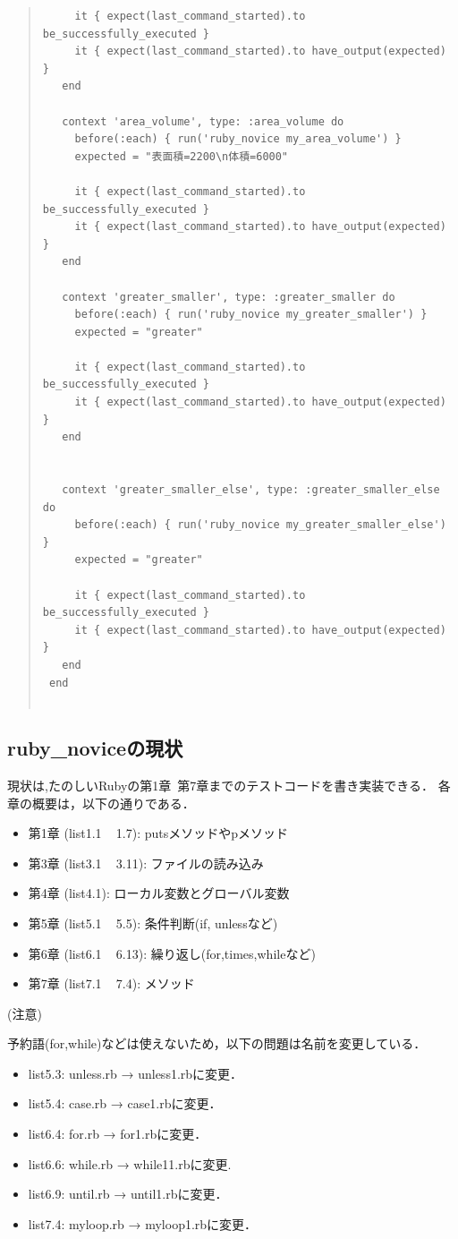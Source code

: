\begin{quote}
\begin{verbatim}
     it { expect(last_command_started).to be_successfully_executed }
     it { expect(last_command_started).to have_output(expected) }
   end
 
   context 'area_volume', type: :area_volume do
     before(:each) { run('ruby_novice my_area_volume') }
     expected = "表面積=2200\n体積=6000"
 
     it { expect(last_command_started).to be_successfully_executed }
     it { expect(last_command_started).to have_output(expected) }
   end
 
   context 'greater_smaller', type: :greater_smaller do
     before(:each) { run('ruby_novice my_greater_smaller') }
     expected = "greater"
 
     it { expect(last_command_started).to be_successfully_executed }
     it { expect(last_command_started).to have_output(expected) }
   end
 
 
   context 'greater_smaller_else', type: :greater_smaller_else do
     before(:each) { run('ruby_novice my_greater_smaller_else') }
     expected = "greater"
 
     it { expect(last_command_started).to be_successfully_executed }
     it { expect(last_command_started).to have_output(expected) }
   end
 end
 
\end{verbatim}\end{quote}
\subsection{ruby\_noviceの現状}
現状は,たのしいRubyの第1章~第7章までのテストコードを書き実装できる．
各章の概要は，以下の通りである．

\begin{itemize}
\item 第1章 (list1.1 ~ 1.7):  putsメソッドやpメソッド
\item 第3章 (list3.1 ~ 3.11): ファイルの読み込み
\item 第4章 (list4.1):        ローカル変数とグローバル変数
\item 第5章 (list5.1 ~ 5.5):  条件判断(if, unlessなど)
\item 第6章 (list6.1 ~ 6.13): 繰り返し(for,times,whileなど)
\item 第7章 (list7.1 ~ 7.4):  メソッド
\end{itemize}
(注意)

予約語(for,while)などは使えないため，以下の問題は名前を変更している．

\begin{itemize}
\item list5.3:  unless.rb → unless1.rbに変更．
\item list5.4:  case.rb → case1.rbに変更．
\item list6.4:  for.rb → for1.rbに変更．
\item list6.6:  while.rb → while11.rbに変更.
\item list6.9:  until.rb → until1.rbに変更．
\item list7.4:  myloop.rb → myloop1.rbに変更．
\end{itemize}
